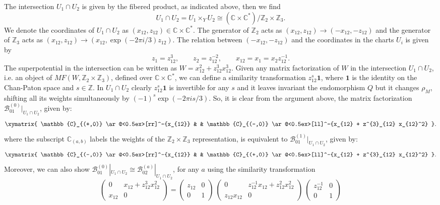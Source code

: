 \documentclass[a4paper,11pt]{article}
\numberwithin{equation}{section}
\begin{document}
The intersection $U_1\cap U_{2}$ is given by the fibered product, as indicated 
above, then we find
\[
U_1\cap U_{2}=U_1\times_{Y} U_{2}\cong (\mathbb{C}\times 
\mathbb{C}^{*})/\mathbb{Z}_2 \times \mathbb{Z}_3.
\]
We denote the coordinates of $U_1\cap U_{2}$ as $(x_{12},z_{12})\in 
\mathbb{C}\times 
\mathbb{C}^{*}$. The generator of $\mathbb{Z}_2$ acts as
$(x_{12},z_{12})\rightarrow(-x_{12},-z_{12})$ and the generator of 
$\mathbb{Z}_3$ acts as
$(x_{12},z_{12})\rightarrow(x_{12},\exp(-2\pi i /3)z_{12})$. The relation 
between $(-x_{12},-z_{12})$ and the coordinates in the charts $U_{i}$ is given 
by
\[
z_{1}=z_{12}^{3},\qquad z_{2}=z_{12}^{-2},\qquad x_{12}=x_{1}=x_{2}z_{12}^{-1}.
\]
The superpotential in the intersection can be written as 
$W=x_{12}^{2}+z_{12}^{3}x_{12}^{3}$. Given any 
matrix factorization of $W$ in the intersection $U_1\cap U_{2}$, i.e. an object 
of $MF(W,\mathbb{Z}_2 \times \mathbb{Z}_3)$, defined over $\mathbb{C}\times 
\mathbb{C}^{*}$,  we can define a 
similarity transformation \cite{Walcher:2004tx} $z_{12}^{s}\mathbf{1}$, where 
$\mathbf{1}$ is the identity on the Chan-Paton space and $s\in \mathbb{Z}$. In 
$U_1\cap U_{2}$ clearly $z_{12}^{s}\mathbf{1}$ is invertible for any $s$ and it 
leaves invariant the endomorphism $Q$ but it changes $\rho_{M}$, shifting all 
its 
weights simultaneously by $(-1)^{s}\exp(-2\pi i s/3)$. So, it is clear from the 
argument above, the matrix factorization 
$\mathcal{B}^{(0)}_{01}|_{U_1\cap U_2}$, given by:
\[
\xymatrix{
	\mathbb{C}_{(+,0)} \ar@<0.5ex>[rr]^-{x_{12}} & &
\mathbb{C}_{(-,0)} \ar@<0.5ex>[ll]^-{x_{12} + z^{3}_{12} x_{12}^2}
}.
\]
where the subscript $\mathbb{C}_{(a,b)}$ labels the weights of the $\mathbb{Z}_2 
\times \mathbb{Z}_3$ representation, is equivalent to 
$\mathcal{B}^{(1)}_{01}|_{U_1\cap U_2}$, given by:
\[
\xymatrix{
	\mathbb{C}_{(-,0)} \ar@<0.5ex>[rr]^-{x_{12}} & &
\mathbb{C}_{(+,0)} \ar@<0.5ex>[ll]^-{x_{12} + z^{3}_{12} x_{12}^2}
}.
\]
Moreover, we can also show 
$\mathcal{B}_{01}^{(0)}|_{U_1\cap U_{2}}\cong 
\mathcal{B}_{02}^{(a)}|_{U_1\cap U_{2}}$, for any $a$ using the 
similarity transformation
\[
\left(
\begin{array}{cc}
0 & x_{12}+z^{3}_{12} x_{12}^2 \\ x_{12} & 0
\end{array} \right) = 
\left(
\begin{array}{cc}
z_{12} & 0 \\ 0 & 1
\end{array} \right)~
\left(
\begin{array}{cc}
0 & z_{12}^{-1} x_{12} + z_{12}^{2}x_{12}^2 \\ z_{12}x_{12} & 0
\end{array} \right)~
\left(
\begin{array}{cc}
z_{12}^{-1} & 0 \\ 0 & 1
\end{array} \right)
\]
\end{document}
